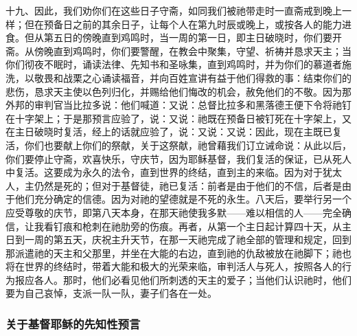 十九、因此，我们劝你们在这些日子守斋，如同我们被祂带走时一直斋戒到晚上一样；但在预备日之前的其余日子，让每个人在第九时辰或晚上，或按各人的能力进食。但从第五日的傍晚直到鸡鸣时，当一周的第一日，即主日破晓时，你们要开斋。从傍晚直到鸡鸣时，你们要警醒，在教会中聚集，守望、祈祷并恳求天主；当你们彻夜不眠时，诵读法律、先知书和圣咏集，直到鸡鸣时，并为你们的慕道者施洗，以敬畏和战栗之心诵读福音，并向百姓宣讲有益于他们得救的事：结束你们的悲伤，恳求天主使以色列归化，并赐给他们悔改的机会，赦免他们的不敬。因为那外邦的审判官当比拉多说：他们喊道：又说：总督比拉多和黑落德王便下令将祂钉在十字架上；于是那预言应验了，说：又说：祂既在预备日被钉死在十字架上，又在主日破晓时复活，经上的话就应验了，说：又说：又说：因此，现在主既已复活，你们也要献上你们的祭献，关于这祭献，祂曾藉我们订立诫命说：从此以后，你们要停止守斋，欢喜快乐，守庆节，因为耶稣基督，我们复活的保证，已从死人中复活。这要成为永久的法令，直到世界的终结，直到主的来临。因为对于犹太人，主仍然是死的；但对于基督徒，祂已复活：前者是由于他们的不信，后者是由于他们充分确定的信德。因为对祂的望德就是不死的永生。八天后，要举行另一个应受尊敬的庆节，即第八天本身，在那天祂使我多默——难以相信的人——完全确信，让我看钉痕和枪刺在祂肋旁的伤痕。再者，从第一个主日起计算四十天，从主日到一周的第五天，庆祝主升天节，在那一天祂完成了祂全部的管理和规定，回到那派遣祂的天主和父那里，并坐在大能的右边，直到祂的仇敌被放在祂脚下；祂也将在世界的终结时，带着大能和极大的光荣来临，审判活人与死人，按照各人的行为报应各人。那时，他们必看见他们所刺透的天主的爱子；当他们认识祂时，他们要为自己哀悼，支派一队一队，妻子们各在一处。\par


\subsubsection{关于基督耶稣的先知性预言}

